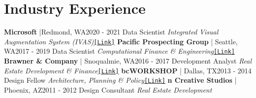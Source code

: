 \documentclass{article}
\begin{document}
    \section*{Industry Experience}
        \textbf{Microsoft} |Redmond, WA\hfill{2020 - 2021}\newline
        Data Scientist\newline
        \textit{Integrated Visual Augmentation System (IVAS)}\space\href{https://news.microsoft.com/transform/u-s-army-to-use-hololens-technology-in-high-tech-headsets-for-soldiers/}{\texttt{[Link]}}\newline\newline
        \textbf{Pacific Prospecting Group} | Seattle, WA\hfill{2017 - 2019}\newline
        Data Scientist\newline
        \textit{Computational Finance \& Engineering}\space\href{http://pacificprospectinggroup.com}{\texttt{[Link]}}\newline\newline
        \textbf{Brawner \& Company} | Snoqualmie, WA\hfill{2016 - 2017}\newline
        Development Analyst\newline
        \textit{Real Estate Development \& Finance}\space\href{https://jhbrawner.com}{\texttt{[Link]}}\newline\newline
        \textbf{bcWORKSHOP} | Dallas, TX\hfill{2013 - 2014}\newline
        Design Fellow\newline
        \textit{Architecture, Planning \& Policy}\space\href{https://www.bcworkshop.org}{\texttt{[Link]}}\newline\newline
        \textbf{n Creative Studios} | Phoenix, AZ\hfill{2011 - 2012}\newline
        Design Consultant\newline
        \textit{Real Estate Development}
\end{document}
